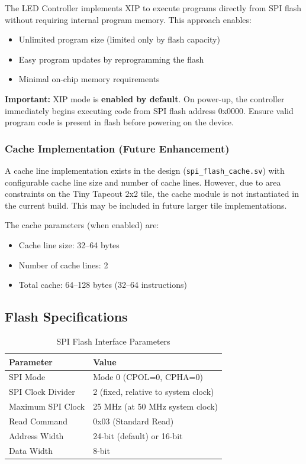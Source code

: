 \documentclass[11pt,a4paper]{article}
\begin{document}
The LED Controller implements XIP to execute programs directly from SPI flash without requiring internal program memory. This approach enables:

\begin{itemize}[noitemsep]
    \item Unlimited program size (limited only by flash capacity)
    \item Easy program updates by reprogramming the flash
    \item Minimal on-chip memory requirements
\end{itemize}

\textbf{Important:} XIP mode is \textbf{enabled by default}. On power-up, the controller immediately begins executing code from SPI flash address 0x0000. Ensure valid program code is present in flash before powering on the device.

\subsubsection{Cache Implementation (Future Enhancement)}

A cache line implementation exists in the design (\texttt{spi\_flash\_cache.sv}) with configurable cache line size and number of cache lines. However, due to area constraints on the Tiny Tapeout 2x2 tile, the cache module is not instantiated in the current build. This may be included in future larger tile implementations.

The cache parameters (when enabled) are:
\begin{itemize}[noitemsep]
    \item Cache line size: 32--64 bytes
    \item Number of cache lines: 2
    \item Total cache: 64--128 bytes (32--64 instructions)
\end{itemize}

\subsection{Flash Specifications}

\begin{table}[H]
\centering
\caption{SPI Flash Interface Parameters}
\begin{tabular}{@{}ll@{}}
\toprule
\textbf{Parameter} & \textbf{Value} \\
\midrule
SPI Mode & Mode 0 (CPOL=0, CPHA=0) \\
SPI Clock Divider & 2 (fixed, relative to system clock) \\
Maximum SPI Clock & 25 MHz (at 50 MHz system clock) \\
Read Command & 0x03 (Standard Read) \\
Address Width & 24-bit (default) or 16-bit \\
Data Width & 8-bit \\
\bottomrule
\end{tabular}
\end{table}
\end{document}
